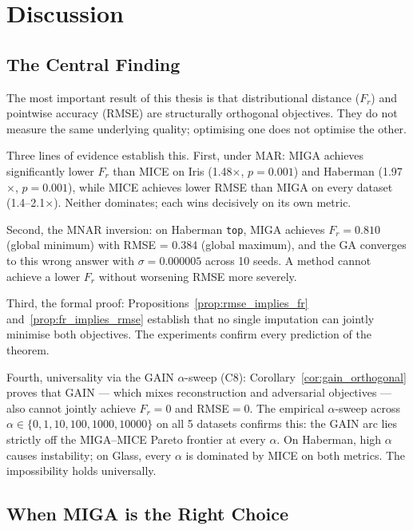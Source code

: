 
\chapter{Discussion}
\label{Chapter5}

\section{The Central Finding}

The most important result of this thesis is that distributional distance ($F_r$) and pointwise accuracy (RMSE) are structurally orthogonal objectives. They do not measure the same underlying quality; optimising one does not optimise the other.

Three lines of evidence establish this. First, under MAR: MIGA achieves significantly lower $F_r$ than MICE on Iris (1.48$\times$, $p=0.001$) and Haberman (1.97$\times$, $p=0.001$), while MICE achieves lower RMSE than MIGA on every dataset (1.4--2.1$\times$). Neither dominates; each wins decisively on its own metric.

Second, the MNAR inversion: on Haberman \texttt{top}, MIGA achieves $F_r = 0.810$ (global minimum) with RMSE = 0.384 (global maximum), and the GA converges to this wrong answer with $\sigma = 0.000005$ across 10 seeds. A method cannot achieve a lower $F_r$ without worsening RMSE more severely.

Third, the formal proof: Propositions~\ref{prop:rmse_implies_fr} and~\ref{prop:fr_implies_rmse} establish that no single imputation can jointly minimise both objectives. The experiments confirm every prediction of the theorem.

Fourth, universality via the GAIN $\alpha$-sweep (C8): Corollary~\ref{cor:gain_orthogonal} proves that GAIN --- which mixes reconstruction and adversarial objectives --- also cannot jointly achieve $F_r=0$ and RMSE$=0$. The empirical $\alpha$-sweep across $\alpha \in \{0, 1, 10, 100, 1000, 10000\}$ on all 5 datasets confirms this: the GAIN arc lies strictly off the MIGA--MICE Pareto frontier at every $\alpha$. On Haberman, high $\alpha$ causes instability; on Glass, every $\alpha$ is dominated by MICE on both metrics. The impossibility holds universally.

\section{When MIGA is the Right Choice}
\label{sec:scope_conditions}

